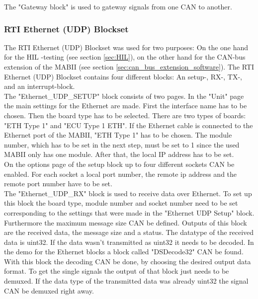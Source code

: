 \documentclass[ExampleMasters.tex]{subfiles}
\begin{document}
The "Gateway block" is used to gateway signals from one \gls{CAN} to another. 
\subsubsection{RTI Ethernet (UDP) Blockset}
The \gls{RTI} Ethernet (\gls{UDP}) Blockset was used for two purposes: On the one hand for the \gls{HIL} -testing (see section \ref{sec:HIL}), on the other hand for the \gls{CAN}-bus extension of the \gls{MABII} (see section \ref{sec:can_bus_extension_software}). The \gls{RTI} Ethernet (UDP) Blockset contains four different blocks: An setup-, RX-, TX-, and an interrupt-block.\\
The "Ethernet\_UDP\_SETUP" block consists of two pages. In the "Unit" page the main settings for the Ethernet are made. First the interface name has to be chosen. Then the board type has to be selected. There are two types of boards: "ETH Type 1" and "ECU Type 1 ETH". If the Ethernet cable is connected to the Ethernet port of the \gls{MABII}, "ETH Type 1" has to be chosen. The module number, which has to be set in the next step, must be set to 1 since the used \gls{MABII} only has one module.
After that, the local \gls{IP} address has to be set.\\
On the options page of the setup block up to four different sockets \gls{CAN} be enabled. For each socket a local port number, the remote ip address and the remote port number have to be set.\\
 
The "Ethernet\_UDP\_RX" block is used to receive data over Ethernet. To set up this block the board type, module number and socket number need to be set corresponding to the settings that were made in the "Ethernet \gls{UDP} Setup" block. Furthermore the maximum message size \gls{CAN} be defined. Outputs of this block are the received data, the message size and a status. The datatype of the received data is uint32. If the data wasn't transmitted as uint32 it needs to be decoded. In the demo for the Ethernet blocks a block called "DSDecode32" \gls{CAN} be found. With this block the decoding \gls{CAN} be done, by choosing the desired output data format. To get the single signals the output of that block just needs to be demuxed. If the data type of the transmitted data was already uint32 the signal \gls{CAN} be demuxed right away.
\end{document}
